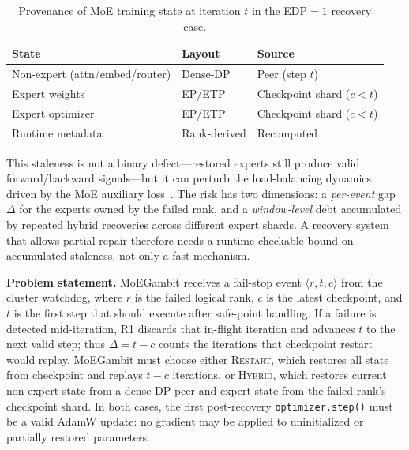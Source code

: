 \documentclass[10pt,conference]{IEEEtran}
\begin{document}
\begin{table}[!t]
\caption{Provenance of MoE training state at iteration $t$ in the EDP$=1$ recovery case.}
\label{tab:state-provenance}
\setlength{\tabcolsep}{1pt}
\renewcommand{\arraystretch}{1.12}
\footnotesize
\begin{center}
\begin{tabular}{@{}lll@{}}
\toprule
\textbf{State} & \textbf{Layout} & \textbf{Source} \\
\midrule
Non-expert (attn/embed/router) & Dense-DP & Peer (step $t$) \\
Expert weights      & EP/ETP & Checkpoint shard ($c\!<\!t$) \\
Expert optimizer    & EP/ETP & Checkpoint shard ($c\!<\!t$) \\
Runtime metadata    & Rank-derived  & Recomputed \\
\bottomrule
\end{tabular}
\end{center}
\end{table}

This staleness is not a binary defect---restored experts still produce valid forward/backward signals---but it can perturb the load-balancing dynamics driven by the MoE auxiliary loss~\cite{shazeer2017outrageously,fedus2022switch,zoph2022stmoe,komatsuzaki2023sparse}. The risk has two dimensions: a \emph{per-event} gap $\Delta$ for the experts owned by the failed rank, and a \emph{window-level} debt accumulated by repeated hybrid recoveries across different expert shards. A recovery system that allows partial repair therefore needs a runtime-checkable bound on accumulated staleness, not only a fast mechanism.


\textbf{Problem statement.} MoEGambit receives a fail-stop event $\langle r,t,c\rangle$ from the cluster watchdog, where $r$ is the failed logical rank, $c$ is the latest checkpoint, and $t$ is the first step that should execute after safe-point handling. If a failure is detected mid-iteration, R1 discards that in-flight iteration and advances $t$ to the next valid step; thus $\Delta=t-c$ counts the iterations that checkpoint restart would replay. MoEGambit must choose either \textsc{Restart}, which restores all state from checkpoint and replays $t-c$ iterations, or \textsc{Hybrid}, which restores current non-expert state from a dense-DP peer and expert state from the failed rank's checkpoint shard. In both cases, the first post-recovery \texttt{optimizer.step()} must be a valid AdamW update: no gradient may be applied to uninitialized or partially restored parameters.
\end{document}
